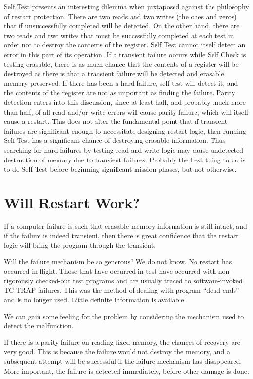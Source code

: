 \documentclass[oxford]{ahsan}
\begin{document}
Self Test presents an interesting dilemma when juxtaposed against the philosophy of
restart protection. There are two reads and two writes (the ones and zeros) that if
unsuccessfully completed will be detected. On the other hand, there are two reads and
two writes that must be successfully completed at each test in order not to destroy the
contents of the register. Self Test cannot itself detect an error in this part of its
operation. If a transient failure occurs while Self Check is testing erasable, there is
as much chance that the contents of a register will be destroyed as there is that a
transient failure will be detected and erasable memory preserved. If there has been a
hard failure, self test will detect it, and the contents of the register are not as
important as finding the failure. Parity detection enters into this discussion, since
at least half, and probably much more than half, of all read and/or write errors will
cause parity failure, which will itself cause a restart. This does not alter the
fundamental point that if transient failures are significant enough to necessitate
designing restart logic, then running Self Test has a significant chance of destroying
erasable information. Thus searching for hard failures by testing read and write logic
may cause undetected destruction of memory due to transient failures. Probably the best
thing to do is to do Self Test before beginning significant mission phases, but not
otherwise.

\section{Will Restart Work?}

If a computer failure is such that erasable memory information is still intact, and if
the failure is indeed transient, then there is great confidence that the restart logic
will bring the program through the transient.

Will the failure mechanism be so generous? We do not know. No restart has occurred in
flight. Those that have occurred in test have occurred with non-rigorously checked-out
test programs and are usually traced to software-invoked TC TRAP failures. This was the
method of dealing with program “dead ends” and is no longer used. Little definite
information is available.

We can gain some feeling for the problem by considering the mechanism used to detect
the malfunction.

If there is a parity failure on reading fixed memory, the chances of recovery are very
good. This is because the failure would not destroy the memory, and a subsequent
attempt will be successful if the failure mechanism has disappeared. More important,
the failure is detected immediately, before other damage is done.
\end{document}
